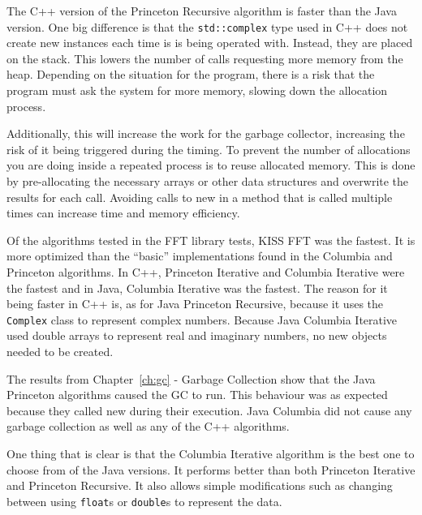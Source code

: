 The C++ version of the Princeton Recursive algorithm is faster than the Java version. One big difference is that the \texttt{std::complex} type used in C++ does not create new instances each time is is being operated with. Instead, they are placed on the stack. This lowers the number of calls requesting more memory from the heap. Depending on the situation for the program, there is a risk that the program must ask the system for more memory, slowing down the allocation process.

Additionally, this will increase the work for the garbage collector, increasing the risk of it being triggered during the timing. To prevent the number of allocations you are doing inside a repeated process is to reuse allocated memory. This is done by pre-allocating the necessary arrays or other data structures and overwrite the results for each call. Avoiding calls to new in a method that is called multiple times can increase time and memory efficiency.

Of the algorithms tested in the FFT library tests, KISS FFT was the fastest. It is more optimized than the \enquote{basic} implementations found in the Columbia and Princeton algorithms. In C++, Princeton Iterative and Columbia Iterative were the fastest and in Java, Columbia Iterative was the fastest. The reason for it being faster in C++ is, as for Java Princeton Recursive, because it uses the \texttt{Complex} class to represent complex numbers. Because Java Columbia Iterative used double arrays to represent real and imaginary numbers, no new objects needed to be created.

The results from Chapter~\ref{ch:gc} - Garbage Collection show that the Java Princeton algorithms caused the GC to run. This behaviour was as expected because they called new during their execution. Java Columbia did not cause any garbage collection as well as any of the C++ algorithms.


One thing that is clear is that the Columbia Iterative algorithm is the best one to choose from of the Java versions. It performs better than both Princeton Iterative and Princeton Recursive. It also allows simple modifications such as changing between using \texttt{float}s or  \texttt{double}s to represent the data.

